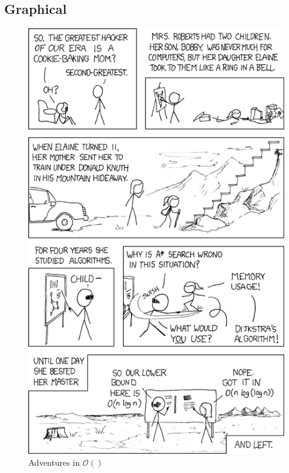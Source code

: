 \documentclass[aspectratio=169]{beamer}
\begin{document}
\subsection{Graphical}
\begin{frame}
\begin{figure}
\includegraphics[scale=0.21]{../artifacts/big-o-knuth.png}
\caption{Adventures in $\mathcal{O}()$}
\label{fig:xkcd}
\end{figure}
\end{frame}
\end{document}
